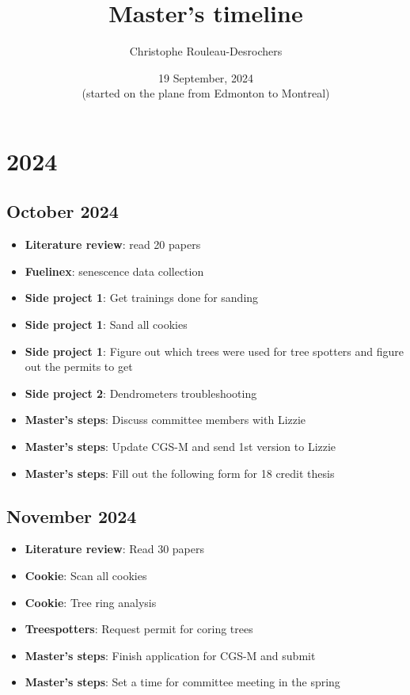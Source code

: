 \documentclass{article}
\title{Master's timeline}
\author[]{Christophe Rouleau-Desrochers}
\date{19 September, 2024 \\ (started on the plane from Edmonton to Montreal)}
\begin{document}
\maketitle

\tableofcontents
\newpage


\section*{\centering \Large 2024}

\subsection*{October 2024}
\begin {itemize}
	\item \textbf{Literature review}: read 20 papers
	\item \textbf{Fuelinex}: senescence data collection
	\item \textbf{Side project 1}: Get trainings done for sanding 
	\item \textbf{Side project 1}: Sand all cookies
	\item \textbf{Side project 1}: Figure out which trees were used for tree spotters and figure out the permits to get
	\item \textbf{Side project 2}: Dendrometers troubleshooting
	\item \textbf{Master's steps}: Discuss committee members with Lizzie 
	\item \textbf{Master's steps}: Update CGS-M and send 1st version to Lizzie
	\item \textbf{Master's steps}: Fill out the following form for 18 credit thesis %
\end {itemize}


\subsection*{November 2024}
\begin{itemize}
    \item \textbf{Literature review}: Read 30 papers
    \item \textbf{Cookie}: Scan all cookies
    \item \textbf{Cookie}: Tree ring analysis
    \item \textbf{Treespotters}: Request permit for coring trees 
    \item \textbf{Master's steps}: Finish application for CGS-M and submit
    \item \textbf{Master's steps}: Set a time for committee meeting in the spring
\end{itemize}
\end{document}
